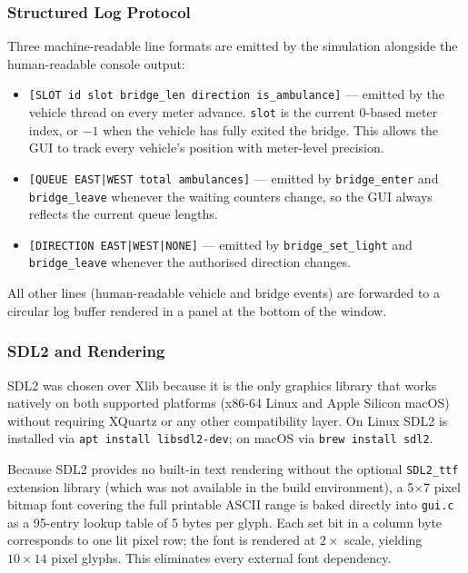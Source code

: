 \documentclass[12pt]{article}
\begin{document}
\subsubsection{Structured Log Protocol}

Three machine-readable line formats are emitted by the simulation alongside
the human-readable console output:

\begin{itemize}
  \item \texttt{[SLOT id slot bridge\_len direction is\_ambulance]} ---
    emitted by the vehicle thread on every meter advance. \texttt{slot} is
    the current 0-based meter index, or $-1$ when the vehicle has fully
    exited the bridge. This allows the GUI to track every vehicle's position
    with meter-level precision.
  \item \texttt{[QUEUE EAST|WEST total ambulances]} --- emitted by
    \texttt{bridge\_enter} and \texttt{bridge\_leave} whenever the waiting
    counters change, so the GUI always reflects the current queue lengths.
  \item \texttt{[DIRECTION EAST|WEST|NONE]} --- emitted by
    \texttt{bridge\_set\_light} and \texttt{bridge\_leave} whenever the
    authorised direction changes.
\end{itemize}

All other lines (human-readable vehicle and bridge events) are forwarded to
a circular log buffer rendered in a panel at the bottom of the window.

\subsubsection{SDL2 and Rendering}

SDL2 was chosen over Xlib because it is the only graphics library that
works natively on both supported platforms (x86-64 Linux and Apple Silicon
macOS) without requiring XQuartz or any other compatibility layer. On Linux
SDL2 is installed via \texttt{apt install libsdl2-dev}; on macOS via
\texttt{brew install sdl2}.

Because SDL2 provides no built-in text rendering without the optional
\texttt{SDL2\_ttf} extension library (which was not available in the build
environment), a 5$\times$7 pixel bitmap font covering the full printable
ASCII range is baked directly into \texttt{gui.c} as a 95-entry lookup
table of 5 bytes per glyph. Each set bit in a column byte corresponds to
one lit pixel row; the font is rendered at $2\times$ scale, yielding
$10\times14$ pixel glyphs. This eliminates every external font dependency.
\end{document}
